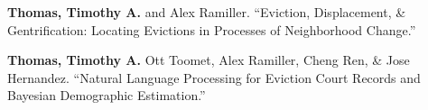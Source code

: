 










\begin{cvparagraph}

\textbf{Thomas, Timothy A.} and Alex Ramiller. “Eviction, Displacement, \& Gentrification: Locating Evictions in Processes of Neighborhood Change.”
\end{cvparagraph}

\begin{cvparagraph}

\textbf{Thomas, Timothy A.} Ott Toomet, Alex Ramiller, Cheng Ren, \& Jose Hernandez. “Natural Language Processing for Eviction Court Records and Bayesian Demographic Estimation.”
\end{cvparagraph}

